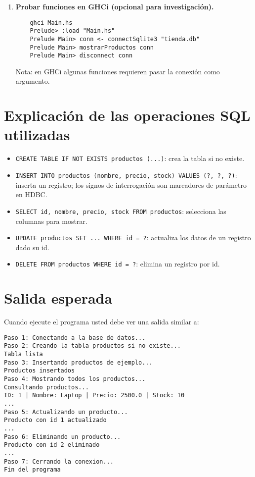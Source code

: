 \documentclass[12pt]{article}
\begin{document}
\begin{enumerate}
  \item \textbf{Probar funciones en GHCi (opcional para investigaci\'on).}
    \begin{verbatim}
    ghci Main.hs
    Prelude> :load "Main.hs"
    Prelude Main> conn <- connectSqlite3 "tienda.db"
    Prelude Main> mostrarProductos conn
    Prelude Main> disconnect conn
    \end{verbatim}
    Nota: en GHCi algunas funciones requieren pasar la conexi\'on como argumento.

\end{enumerate}

\section*{Explicaci\'on de las operaciones SQL utilizadas}
\begin{itemize}
  \item \texttt{CREATE TABLE IF NOT EXISTS productos (...)}: crea la tabla si no existe.
  \item \texttt{INSERT INTO productos (nombre, precio, stock) VALUES (?, ?, ?)}: inserta un registro; los signos de interrogaci\'on son marcadores de par\'ametro en HDBC.
  \item \texttt{SELECT id, nombre, precio, stock FROM productos}: selecciona las columnas para mostrar.
  \item \texttt{UPDATE productos SET ... WHERE id = ?}: actualiza los datos de un registro dado su id.
  \item \texttt{DELETE FROM productos WHERE id = ?}: elimina un registro por id.
\end{itemize}

\section*{Salida esperada}
Cuando ejecute el programa usted debe ver una salida similar a:
\begin{verbatim}
Paso 1: Conectando a la base de datos...
Paso 2: Creando la tabla productos si no existe...
Tabla lista
Paso 3: Insertando productos de ejemplo...
Productos insertados
Paso 4: Mostrando todos los productos...
Consultando productos...
ID: 1 | Nombre: Laptop | Precio: 2500.0 | Stock: 10
...
Paso 5: Actualizando un producto...
Producto con id 1 actualizado
...
Paso 6: Eliminando un producto...
Producto con id 2 eliminado
...
Paso 7: Cerrando la conexion...
Fin del programa
\end{verbatim}
\end{document}
